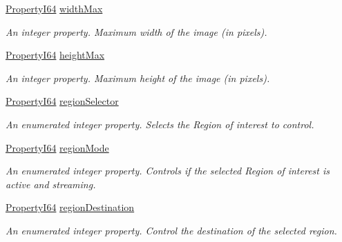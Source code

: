 \begin{DoxyCompactItemize}
\hyperlink{group___common_interface_ga81749b2696755513663492664a18a893}{Property\+I64} \hyperlink{classmv_i_m_p_a_c_t_1_1acquire_1_1_gen_i_cam_1_1_image_format_control_a2c55b3c587d1938aaed00089b322114c}{width\+Max}
\begin{DoxyCompactList}\small\item\em An integer property. Maximum width of the image (in pixels). \end{DoxyCompactList}\item 
\hyperlink{group___common_interface_ga81749b2696755513663492664a18a893}{Property\+I64} \hyperlink{classmv_i_m_p_a_c_t_1_1acquire_1_1_gen_i_cam_1_1_image_format_control_a8540e7cd78b644f597cd679a11558603}{height\+Max}
\begin{DoxyCompactList}\small\item\em An integer property. Maximum height of the image (in pixels). \end{DoxyCompactList}\item 
\hyperlink{group___common_interface_ga81749b2696755513663492664a18a893}{Property\+I64} \hyperlink{classmv_i_m_p_a_c_t_1_1acquire_1_1_gen_i_cam_1_1_image_format_control_aad28b74200b11a31434c8bfeedc408e2}{region\+Selector}
\begin{DoxyCompactList}\small\item\em An enumerated integer property. Selects the Region of interest to control. \end{DoxyCompactList}\item 
\hyperlink{group___common_interface_ga81749b2696755513663492664a18a893}{Property\+I64} \hyperlink{classmv_i_m_p_a_c_t_1_1acquire_1_1_gen_i_cam_1_1_image_format_control_ad297d28dbc9bcd73a6f6af1ddaff8b6f}{region\+Mode}
\begin{DoxyCompactList}\small\item\em An enumerated integer property. Controls if the selected Region of interest is active and streaming. \end{DoxyCompactList}\item 
\hyperlink{group___common_interface_ga81749b2696755513663492664a18a893}{Property\+I64} \hyperlink{classmv_i_m_p_a_c_t_1_1acquire_1_1_gen_i_cam_1_1_image_format_control_aa0cbc8a0b29c1406c45ef8b16bd92bdb}{region\+Destination}
\begin{DoxyCompactList}\small\item\em An enumerated integer property. Control the destination of the selected region. \end{DoxyCompactList}\item 

\end{DoxyCompactItemize}
